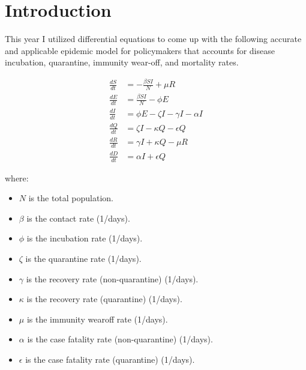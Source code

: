\documentclass{article}
\theoremstyle{definition}
\begin{document}


\tableofcontents
\newpage

\section{Introduction}
\label{section:introduction}
This year I utilized differential equations to come up with the following accurate and applicable epidemic model for policymakers that accounts for disease incubation, quarantine, immunity wear-off, and mortality rates.

\begin{align}        
    \frac{dS}{dt} &= -\frac{\beta S I}{N} + \mu R \\
    \frac{dE}{dt} &= \frac{\beta S I}{N} - \phi E \\
    \frac{dI}{dt} &= \phi E - \zeta I - \gamma I - \alpha I \\
    \frac{dQ}{dt} &= \zeta I - \kappa Q - \epsilon Q \\
    \frac{dR}{dt} &= \gamma I + \kappa Q - \mu R \\
    \frac{dD}{dt} &= \alpha I + \epsilon Q
\end{align}

\noindent
where:
\begin{itemize}
    \item $N$ is the total population.
    \item $\beta$ is the contact rate (1/days).
    \item $\phi$ is the incubation rate (1/days).
    \item $\zeta$ is the quarantine rate (1/days).
    \item $\gamma$ is the recovery rate (non-quarantine) (1/days).
    \item $\kappa$ is the recovery rate (quarantine) (1/days).
    \item $\mu$ is the immunity wearoff rate (1/days).
    \item $\alpha$ is the case fatality rate (non-quarantine) (1/days).
    \item $\epsilon$ is the case fatality rate (quarantine) (1/days).
\end{itemize}




\end{document}
